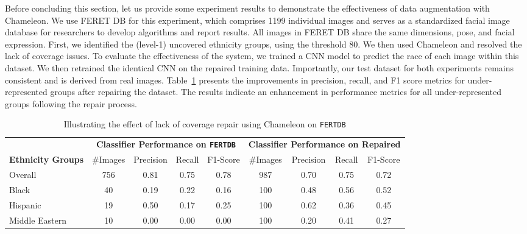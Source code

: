 \documentclass[11pt]{article}
\newcommand{\fmsystem}{{\sc Chameleon}\xspace}
\begin{document}
Before concluding this section, let us provide some experiment results to demonstrate the effectiveness of data augmentation with \fmsystem. We use FERET DB \cite{phillips1998feret} for this experiment, which comprises 1199 individual images and serves as a standardized facial image database for researchers to develop algorithms and report results. All images in FERET DB share the same dimensions, pose, and facial expression.
First, we identified the (level-1) uncovered ethnicity groups, using the threshold 80. We then used \fmsystem and resolved the lack of coverage issues.
To evaluate the effectiveness of the system, we trained a CNN model to predict the race of each image within this dataset. We then retrained the identical CNN on the repaired training data. Importantly, our test dataset for both experiments remains consistent and is derived from real images.
Table~\ref{tab:lackofcoverage} presents the improvements in precision, recall, and F1 score metrics for under-represented groups after repairing the dataset. The results indicate an enhancement in performance metrics for all under-represented groups following the repair process.

\begin{table}[t]
    \centering
    \caption{Illustrating the effect of lack of coverage repair using \fmsystem on \texttt{FERTDB}}
    \label{tab:lackofcoverage}
    \vspace{-3mm}
    \begin{tabular}{lcccccccc}
        \toprule
         & \multicolumn{4}{c}{\textbf{Classifier Performance on \texttt{FERTDB}}} & \multicolumn{4}{c}{\textbf{Classifier Performance on Repaired}} \\
        \cmidrule(lr){2-5} \cmidrule(lr){6-9}
        \textbf{Ethnicity Groups}& \#Images & Precision & Recall & F1-Score & \#Images & Precision & Recall & F1-Score \\
        \midrule
        Overall          & 756 & 0.81 & 0.75 & 0.78 & 987 & 0.70 & 0.75 & 0.72 \\ \hline
        Black            & 40  & 0.19 & 0.22 & 0.16 & 100 & 0.48 & 0.56 & 0.52 \\
        Hispanic         & 19  & 0.50 & 0.17 & 0.25 & 100 & 0.62 & 0.36 & 0.45 \\
        Middle Eastern   & 10  & 0.00 & 0.00 & 0.00 & 100 & 0.20 & 0.41 & 0.27 \\
        \bottomrule
    \end{tabular}
\end{table}
\end{document}
